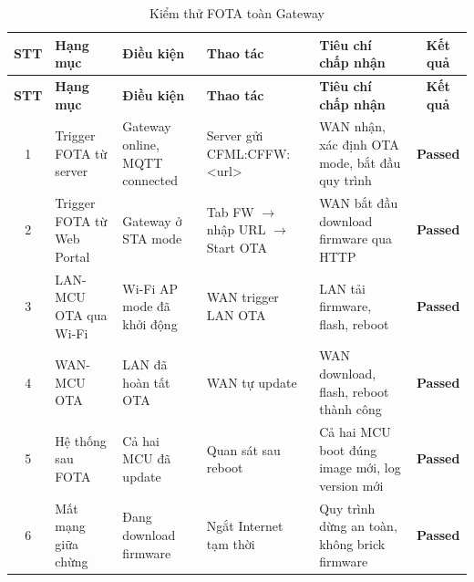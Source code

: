         \begin{longtable}{|c|p{}|p{}|p{}|p{}|c|}
            \caption{Kiểm thử FOTA toàn Gateway}
            \label{tab:test_fota_gateway} \\
            \hline
            \textbf{STT} & \textbf{Hạng mục} & \textbf{Điều kiện} & \textbf{Thao tác} & \textbf{Tiêu chí chấp nhận} & \textbf{Kết quả} \\ \hline
            \endfirsthead
            \hline
            \textbf{STT} & \textbf{Hạng mục} & \textbf{Điều kiện} & \textbf{Thao tác} & \textbf{Tiêu chí chấp nhận} & \textbf{Kết quả} \\ \hline
            \endhead
            \hline
            \endfoot
            \endlastfoot
        
            1 & Trigger FOTA từ server & Gateway online, MQTT connected & Server gửi CFML:CFFW:\newline<url> & WAN nhận, xác định OTA mode, bắt đầu quy trình & \textcolor{modern_blue}{\textbf{Passed}} \\ \hline
            2 & Trigger FOTA từ Web Portal & Gateway ở STA mode & Tab FW $\rightarrow$ nhập URL $\rightarrow$ Start OTA & WAN bắt đầu download firmware qua HTTP & \textcolor{modern_blue}{\textbf{Passed}} \\ \hline
            3 & LAN-MCU OTA qua Wi-Fi & Wi-Fi AP mode đã khởi động & WAN trigger LAN OTA & LAN tải firmware, flash, reboot & \textcolor{modern_blue}{\textbf{Passed}} \\ \hline
            4 & WAN-MCU OTA & LAN đã hoàn tất OTA & WAN tự update & WAN download, flash, reboot thành công & \textcolor{modern_blue}{\textbf{Passed}} \\ \hline
            5 & Hệ thống sau FOTA & Cả hai MCU đã update & Quan sát sau reboot & Cả hai MCU boot đúng image mới, log version mới & \textcolor{modern_blue}{\textbf{Passed}} \\ \hline
            6 & Mất mạng giữa chừng & Đang download firmware & Ngắt Internet tạm thời & Quy trình dừng an toàn, không brick firmware & \textcolor{modern_blue}{\textbf{Passed}} \\ \hline
        \end{longtable}
        
